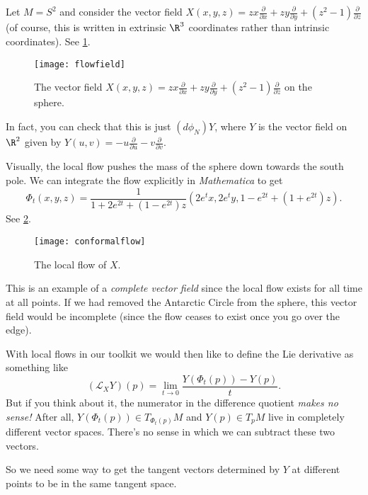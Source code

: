 \begin{example} 
	Let $M = S^2$ and consider the vector field $X(x,y,z) = zx \frac{\partial}{\partial x} + zy \frac{\partial}{\partial y} +\left(z^2-1\right) \frac{\partial}{\partial z}$ (of course, this is written in extrinsic $\R^3$ coordinates rather than intrinsic coordinates). See \cref{fig:flowfield}.
	
	\begin{figure}[htbp]
		\centering
			\texttt{[image: flowfield]}
		\caption{The vector field $X(x,y,z) = zx \frac{\partial}{\partial x} + zy \frac{\partial}{\partial y} +\left(z^2-1\right) \frac{\partial}{\partial z}$ on the sphere.}
		\label{fig:flowfield}
	\end{figure}
	
	In fact, you can check that this is just $(d\phi_N)Y$, where $Y$ is the vector field on $\R^2$ given by $Y(u,v) = -u \frac{\partial}{\partial u} - v \frac{\partial }{\partial v}$.
	
	Visually, the local flow pushes the mass of the sphere down towards the south pole. We can integrate the flow explicitly in \emph{Mathematica} to get
	\[
		\Phi_t(x,y,z) = \frac{1}{1+2e^{2t} + \left(1-e^{2t}\right)z}\left(2e^t x, 2e^t y, 1-e^{2t} + \left(1+e^{2t}\right)z\right).
	\]
	See \cref{fig:conformalflow}.
	
	\begin{figure}[htbp]
		\centering
			\texttt{[image: conformalflow]}
		\caption{The local flow of $X$.}
		\label{fig:conformalflow}
	\end{figure}
	
	This is an example of a \emph{complete vector field} since the local flow exists for all time at all points. If we had removed the Antarctic Circle from the sphere, this vector field would be incomplete (since the flow ceases to exist once you go over the edge).
\end{example}

With local flows in our toolkit we would then like to define the Lie derivative as something like
\[
	(\mathcal{L}_XY)(p) = \lim_{t \to 0} \frac{Y(\Phi_t(p)) - Y(p)}{t}.
\]
But if you think about it, the numerator in the difference quotient \emph{makes no sense!} After all, $Y(\Phi_t(p)) \in T_{\Phi_t(p)}M$ and $Y(p) \in T_pM$ live in completely different vector spaces. There's no sense in which we can subtract these two vectors.

So we need some way to get the tangent vectors determined by $Y$ at different points to be in the same tangent space.

